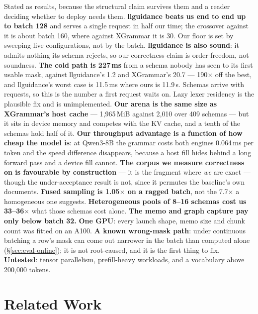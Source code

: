 \documentclass{article}
\begin{document}
Stated as results, because the structural claim survives them and a reader
deciding whether to deploy needs them. \textbf{llguidance beats us end to end up to
batch 128} and serves a single request in half our time; the crossover against
it is about batch 160, where against XGrammar it is 30. Our floor is set by
sweeping live configurations, not by the batch. \textbf{llguidance is also
sound}: it admits nothing its schema rejects, so our correctness claim is
order-freedom, not soundness. \textbf{The cold path is 227\,ms} from a schema
nobody has seen to its first usable mask, against llguidance's 1.2 and
XGrammar's 20.7 --- 190$\times$ off the best, and llguidance's worst case is
11.5\,ms where ours is 11.9\,s. Schemas arrive with requests, so this is the
number a first request waits on. Lazy lexer residency is the plausible fix and is
unimplemented. \textbf{Our arena is the same size as XGrammar's host cache} --- 1{,}965\,MiB
against 2{,}010 over 409 schemas --- but it sits in device memory and competes
with the KV cache, and a tenth of the schemas hold half of it.
\textbf{Our throughput advantage is a function of how cheap the model is}: at
Qwen3-8B the grammar costs both engines 0.064\,ms per token and the speed
difference disappears, because a host fill hides behind a long forward pass and
a device fill cannot. \textbf{The corpus we measure correctness on is
favourable by construction} --- it is the fragment where \emph{we} are exact
--- though the under-acceptance result is not, since it permutes the baseline's
own documents. \textbf{Fused sampling is
1.05$\times$ on a ragged batch}, not the 7.7$\times$ a homogeneous one
suggests. \textbf{Heterogeneous pools of 8--16 schemas cost us
33--36$\times$} what those schemas cost alone. \textbf{The memo and graph
capture pay only below batch 32.} \textbf{One GPU}: every launch shape, memo
size and chunk count was fitted on an A100. \textbf{A known wrong-mask path}:
under continuous batching a row's mask can come out narrower in the batch than
computed alone (\S\ref{sec:eval-online}); it is not root-caused, and it is the
first thing to fix. \textbf{Untested}: tensor parallelism, prefill-heavy
workloads, and a vocabulary above 200{,}000 tokens.

\section{Related Work}
\label{sec:related}
\end{document}
